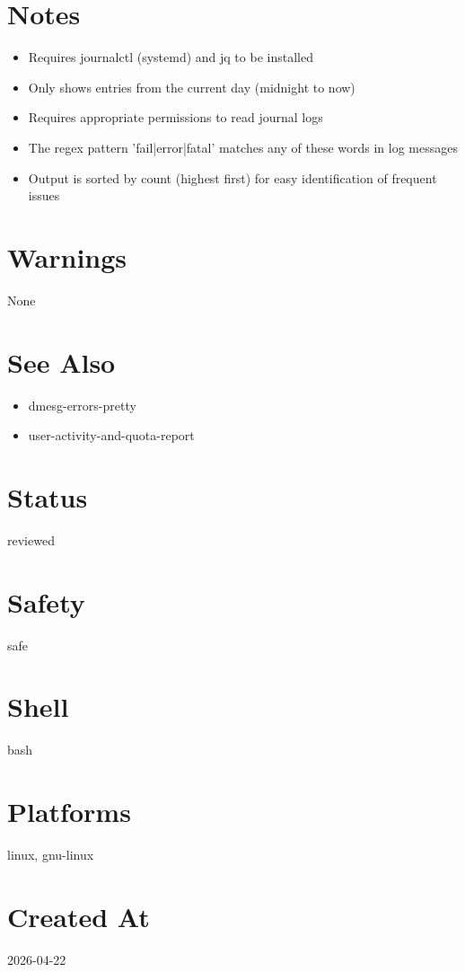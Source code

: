 \documentclass[openany]{book}
\begin{document}
\section*{Notes}
\begin{itemize}
  \item Requires journalctl (systemd) and jq to be installed
  \item Only shows entries from the current day (midnight to now)
  \item Requires appropriate permissions to read journal logs
  \item The regex pattern 'fail|error|fatal' matches any of these words in log messages
  \item Output is sorted by count (highest first) for easy identification of frequent issues
\end{itemize}

\section*{Warnings}
None

\section*{See Also}
\begin{itemize}
  \item dmesg-errors-pretty
  \item user-activity-and-quota-report
\end{itemize}

\section*{Status}
reviewed

\section*{Safety}
safe

\section*{Shell}
bash

\section*{Platforms}
linux, gnu-linux

\section*{Created At}
2026-04-22
\end{document}
